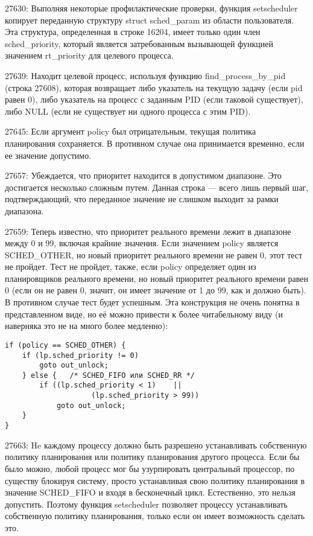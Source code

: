 27630: Выполняя некоторые профилактические проверки, функция setscheduler копирует переданную структуру struct sched\_param из области пользователя. Эта структура, определенная в строке 16204, имеет только один член sched\_priority, который является затребованным вызывающей функцией значением rt\_priority для целевого процесса.

27639: Находит целевой процесс, используя функцию find\_process\_by\_pid (строка 27608), которая возвращает либо указатель на текущую задачу (если pid равен 0), либо указатель на процесс с заданным PID (если таковой существует), либо NULL (если не существует ни одного процесса с этим PID).

27645: Если аргумент policy был отрицательным, текущая политика планирования сохраняется. В противном случае она принимается временно, если ее значение допустимо.

27657: Убеждается, что приоритет находится в допустимом диапазоне. Это достигается несколько сложным путем. Данная строка — всего лишь первый шаг, подтверждающий, что переданное значение не слишком выходит за рамки диапазона.

27659: Теперь известно, что приоритет реального времени лежит в диапазоне между 0 и 99, включая крайние значения. Если значением policy является SCHED\_OTHER, но новый приоритет реального времени не равен 0, этот тест не пройдет. Тест не пройдет, также, если policy определяет один из планировщиков реального времени, но новый приоритет реального времени равен 0 (если он не равен 0, значит, он имеет значение от 1 до 99, как и должно быть). В противном случае тест будет успешным. Эта конструкция не очень понятна в представленном виде, но её можно привести к более читабельному виду (и наверняка это не на много более медленно):

\begin{Verbatim}[frame=single]
if (policy == SCHED_OTHER) {
    if (lp.sched_priority != 0)
        goto out_unlock;
    } else {   /* SCHED_FIFO или SCHED_RR */
        if ((lp.sched_priority < 1)    ||
                    (lp.sched_priority > 99))
            goto out_unlock;
    }
}
\end{Verbatim}

27663: He каждому процессу должно быть разрешено устанавливать собственную политику планирования или политику планирования другого процесса. Если бы было можно, любой процесс мог бы узурпировать центральный процессор, по существу блокируя систему, просто устанавливая свою политику планирования в значение SCHED\_FIFO и входя в бесконечный цикл. Естественно, это нельзя допустить. Поэтому функция setscheduler позволяет процессу устанавливать собственную политику планирования, только если он имеет возможность сделать это.

